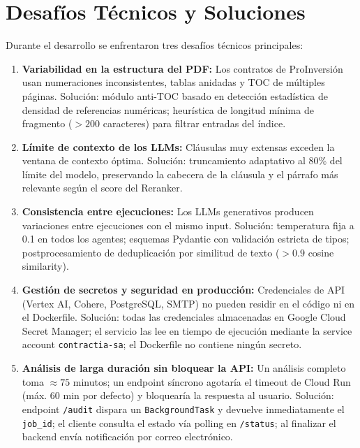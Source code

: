 \section{Desafíos Técnicos y Soluciones}

Durante el desarrollo se enfrentaron tres desafíos técnicos principales:

\begin{enumerate}
    \item \textbf{Variabilidad en la estructura del PDF:}
    Los contratos de ProInversión usan numeraciones inconsistentes,
    tablas anidadas y TOC de múltiples páginas. Solución: módulo anti-TOC
    basado en detección estadística de densidad de referencias numéricas;
    heurística de longitud mínima de fragmento ($> 200$ caracteres) para
    filtrar entradas del índice.

    \item \textbf{Límite de contexto de los LLMs:}
    Cláusulas muy extensas exceden la ventana de contexto óptima.
    Solución: truncamiento adaptativo al 80\% del límite del modelo,
    preservando la cabecera de la cláusula y el párrafo más relevante
    según el score del Reranker.

    \item \textbf{Consistencia entre ejecuciones:}
    Los LLMs generativos producen variaciones entre ejecuciones con el
    mismo input. Solución: temperatura fija a 0.1 en todos los agentes;
    esquemas Pydantic con validación estricta de tipos; postprocesamiento
    de deduplicación por similitud de texto ($> 0.9$ cosine similarity).

    \item \textbf{Gestión de secretos y seguridad en producción:}
    Credenciales de API (Vertex AI, Cohere, PostgreSQL, SMTP) no pueden
    residir en el código ni en el Dockerfile. Solución: todas las
    credenciales almacenadas en Google Cloud Secret Manager; el servicio
    las lee en tiempo de ejecución mediante la service account
    \texttt{contractia-sa}; el Dockerfile no contiene ningún secreto.

    \item \textbf{Análisis de larga duración sin bloquear la API:}
    Un análisis completo toma $\approx 75$ minutos; un endpoint síncrono
    agotaría el timeout de Cloud Run (máx. 60 min por defecto) y bloquearía
    la respuesta al usuario. Solución: endpoint \texttt{/audit} dispara un
    \texttt{BackgroundTask} y devuelve inmediatamente el \texttt{job\_id};
    el cliente consulta el estado vía polling en \texttt{/status}; al
    finalizar el backend envía notificación por correo electrónico.
\end{enumerate}

